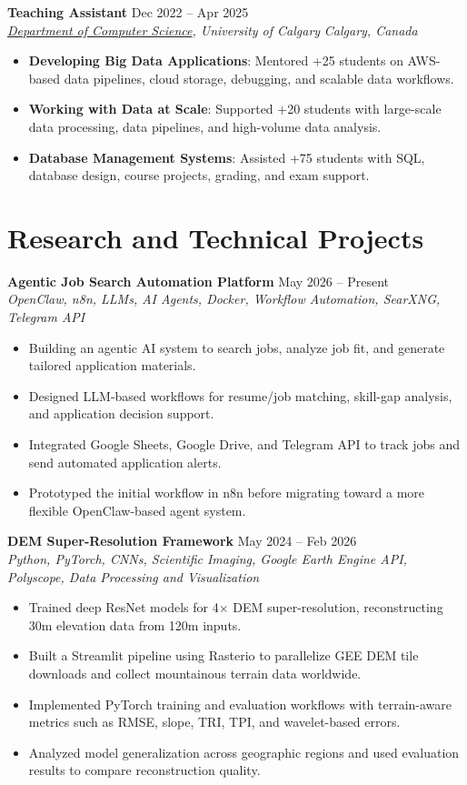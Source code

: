 \documentclass[a4paper,10pt]{article}
\newcommand{\resumeSubheading}[4]{
    \textbf{#1} \hfill #2 \\
    \textit{#3} \hfill \textit{#4}
}
\begin{document}
\resumeSubheading
{Teaching Assistant}
{Dec 2022 -- Apr 2025}
{\href{https://science.ucalgary.ca/computer-science} {Department of Computer Science}, University of Calgary}
{Calgary, Canada}
\begin{itemize}[leftmargin=0.25in]
    \item \textbf{Developing Big Data Applications}: Mentored +25 students on AWS-based data pipelines, cloud storage, debugging, and scalable data workflows.
    \item \textbf{Working with Data at Scale}: Supported +20 students with large-scale data processing, data pipelines, and high-volume data analysis.
    \item \textbf{Database Management Systems}: Assisted +75 students with SQL, database design, course projects, grading, and exam support.
\end{itemize}

\section*{Research and Technical Projects}

\noindent
\textbf{Agentic Job Search Automation Platform} \hfill May 2026 -- Present \\
\textit{OpenClaw, n8n, LLMs, AI Agents, Docker, Workflow Automation, SearXNG, Telegram API}
\begin{itemize}[leftmargin=0.25in]
    \item Building an agentic AI system to search jobs, analyze job fit, and generate tailored application materials.
    \item Designed LLM-based workflows for resume/job matching, skill-gap analysis, and application decision support.
    \item Integrated Google Sheets, Google Drive, and Telegram API to track jobs and send automated application alerts.
    \item Prototyped the initial workflow in n8n before migrating toward a more flexible OpenClaw-based agent system.
\end{itemize}

\noindent
\textbf{DEM Super-Resolution Framework} \hfill May 2024 -- Feb 2026 \\
\textit{Python, PyTorch, CNNs, Scientific Imaging, Google Earth Engine API, Polyscope, Data Processing and Visualization}
\begin{itemize}[leftmargin=0.25in]
    \item Trained deep ResNet models for 4$\times$ DEM super-resolution, reconstructing 30m elevation data from 120m inputs.
    \item Built a Streamlit pipeline using Rasterio to parallelize GEE DEM tile downloads and collect mountainous terrain data worldwide.
    \item Implemented PyTorch training and evaluation workflows with terrain-aware metrics such as RMSE, slope, TRI, TPI, and wavelet-based errors.
    \item Analyzed model generalization across geographic regions and used evaluation results to compare reconstruction quality.
\end{itemize}
\end{document}
